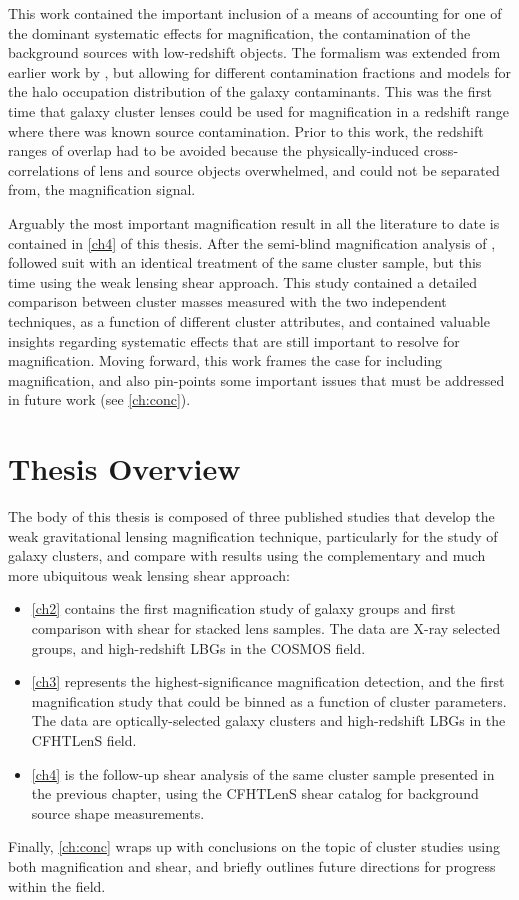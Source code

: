 This work contained the important inclusion of a means of accounting for one of the dominant systematic effects for magnification, the contamination of the background sources with low-redshift objects. The formalism was extended from earlier work by \citet{Hildebrandt13}, but allowing for different contamination fractions and models for the halo occupation distribution of the galaxy contaminants. This was the first time that galaxy cluster lenses could be used for magnification in a redshift range where there was known source contamination. Prior to this work, the redshift ranges of overlap had to be avoided because the physically-induced cross-correlations of lens and source objects overwhelmed, and could not be separated from, the magnification signal.

Arguably the most important magnification result in all the literature to date is contained in \autoref{ch4} of this thesis. After the semi-blind magnification analysis of \citet{Ford14}, \citet{Ford15} followed suit with an identical treatment of the same cluster sample, but this time using the weak lensing shear approach. This study contained a detailed comparison between cluster masses measured with the two independent techniques, as a function of different cluster attributes, and contained valuable insights regarding systematic effects that are still important to resolve for magnification. Moving forward, this work frames the case for including magnification, and also pin-points some important issues that must be addressed in future work (see \autoref{ch:conc}).

\section{Thesis Overview}
\label{sec:Overview}

The body of this thesis is composed of three published studies that develop the weak gravitational lensing magnification technique, particularly for the study of galaxy clusters, and compare with results using the complementary and much more ubiquitous weak lensing shear approach:
\begin{itemize}
\item \autoref{ch2} contains the first magnification study of galaxy groups and first comparison with shear for stacked lens samples. The data are X-ray selected groups, and high-redshift \ac{LBG}s in the \ac{COSMOS} field.
\item \autoref{ch3} represents the highest-significance magnification detection, and the first magnification study that could be binned as a function of cluster parameters. The data are optically-selected galaxy clusters and high-redshift \ac{LBG}s in the \ac{CFHTLenS} field.
\item \autoref{ch4} is the follow-up shear analysis of the same cluster sample presented in the previous chapter, using the \ac{CFHTLenS} shear catalog for background source shape measurements.
\end{itemize}
Finally, \autoref{ch:conc} wraps up with conclusions on the topic of cluster studies using both magnification and shear, and briefly outlines future directions for progress within the field.

\endinput
Any text after an \endinput is ignored.
You could put scraps here or things in progress.
